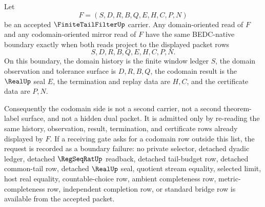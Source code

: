\begin{theorem}
\label{thm:finite-tail-filter-domain-codomain-mirror-boundary}
Let
$$
F=(S,D,R,B,Q,E,H,C,P,N)
$$
be an accepted $\FiniteTailFilterUp$ carrier. Any domain-oriented read of $F$ and any codomain-oriented mirror read of $F$ have the same BEDC-native boundary exactly when both reads project to the displayed packet rows
$$
S,D,R,B,Q,E,H,C,P,N.
$$
On this boundary, the domain history is the finite window ledger $S$, the domain observation and tolerance surface is $D,R,B,Q$, the codomain result is the $\RealUp$ seal $E$, the termination and replay data are $H,C$, and the certificate data are $P,N$.

Consequently the codomain side is not a second carrier, not a second theorem-label surface, and not a hidden dual packet. It is admitted only by re-reading the same history, observation, result, termination, and certificate rows already displayed by $F$. If a receiving gate asks for a codomain row outside this list, the request is recorded as a boundary failure: no private selector, detached dyadic ledger, detached $\RegSeqRatUp$ readback, detached tail-budget row, detached common-tail row, detached $\RealUp$ seal, quotient stream equality, selected limit, host real equality, countable-choice row, ambient completeness row, metric-completeness row, independent completion row, or standard bridge row is available from the accepted packet.
\end{theorem}
